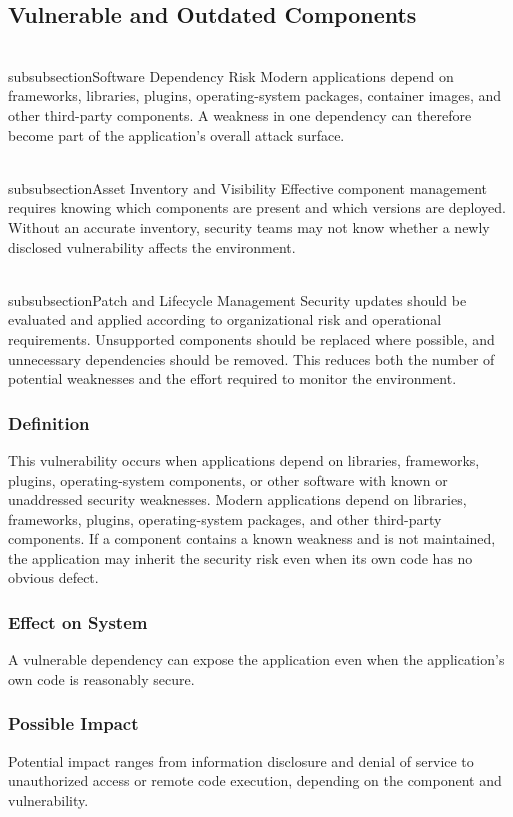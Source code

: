 \documentclass[11pt,a4paper]{article}
\begin{document}
\subsection{Vulnerable and Outdated Components}
\\subsubsection{Software Dependency Risk}
Modern applications depend on frameworks, libraries, plugins, operating-system packages, container images, and other third-party components. A weakness in one dependency can therefore become part of the application's overall attack surface.

\\subsubsection{Asset Inventory and Visibility}
Effective component management requires knowing which components are present and which versions are deployed. Without an accurate inventory, security teams may not know whether a newly disclosed vulnerability affects the environment.

\\subsubsection{Patch and Lifecycle Management}
Security updates should be evaluated and applied according to organizational risk and operational requirements. Unsupported components should be replaced where possible, and unnecessary dependencies should be removed. This reduces both the number of potential weaknesses and the effort required to monitor the environment.

\subsubsection{Definition}
This vulnerability occurs when applications depend on libraries, frameworks, plugins, operating-system components, or other software with known or unaddressed security weaknesses. Modern applications depend on libraries, frameworks, plugins, operating-system packages, and other third-party components. If a component contains a known weakness and is not maintained, the application may inherit the security risk even when its own code has no obvious defect.

\subsubsection{Effect on System}
A vulnerable dependency can expose the application even when the application's own code is reasonably secure.

\subsubsection{Possible Impact}
Potential impact ranges from information disclosure and denial of service to unauthorized access or remote code execution, depending on the component and vulnerability.
\end{document}
